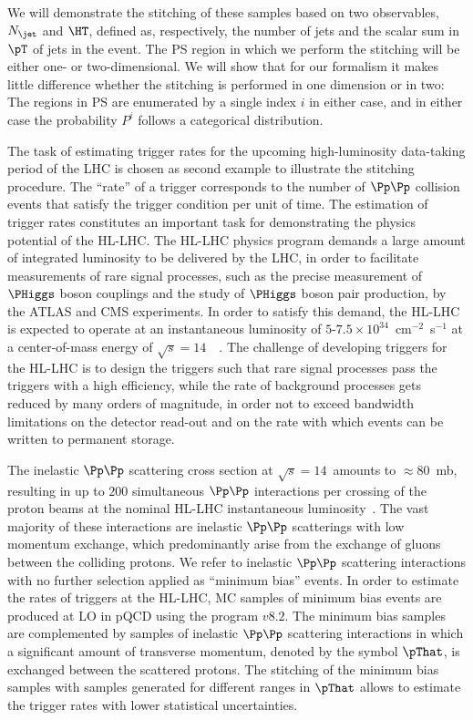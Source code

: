 We will demonstrate the stitching of these samples based on two observables,
$N_{\jet}$ and $\HT$, defined as, respectively, the number of jets and the scalar sum in $\pT$ of jets in the event.
The PS region in which we perform the stitching will be either one- or two-dimensional.
We will show that for our formalism
it makes little difference whether the stitching is performed in one dimension or in two:
The regions in PS are enumerated by a single index $i$ in either case,
and in either case the probability $P^{i}$ follows a categorical distribution.

The task of estimating trigger rates for the upcoming high-luminosity data-taking period of the LHC is chosen as second example to illustrate the stitching procedure.
The ``rate'' of a trigger corresponds to the number of $\Pp\Pp$ collision events that satisfy the trigger condition per unit of time.
The estimation of trigger rates constitutes an important task for demonstrating the physics potential of the HL-LHC.
The HL-LHC physics program demands a large amount of integrated luminosity to be delivered by the LHC, 
in order to facilitate measurements of rare signal processes,
such as the precise measurement of $\PHiggs$ boson couplings and the study of $\PHiggs$ boson pair production, by the ATLAS and CMS experiments.
In order to satisfy this demand, the HL-LHC is expected to operate at an instantaneous luminosity of $5$-$7.5 \times 10^{34}$~cm$^{-2}$~s$^{-1}$
at a center-of-mass energy of $\sqrt{s} = 14$~\TeV~\cite{TDR_Phase2_LHC}.
The challenge of developing triggers for the HL-LHC is to design the triggers such that rare signal processes pass the triggers with a high efficiency,
while the rate of background processes gets reduced by many orders of magnitude, in order not to exceed bandwidth limitations on the detector read-out 
and on the rate with which events can be written to permanent storage.

The inelastic $\Pp\Pp$ scattering cross section at $\sqrt{s} = 14$~\TeV amounts to $\approx 80$~mb,
resulting in up to $200$ simultaneous $\Pp\Pp$ interactions per crossing of the proton beams at the nominal HL-LHC instantaneous luminosity~\cite{TDR_Phase2_LHC}.
The vast majority of these interactions are inelastic $\Pp\Pp$ scatterings with low momentum exchange,
which predominantly arise from the exchange of gluons between the colliding protons.
We refer to inelastic $\Pp\Pp$ scattering interactions with no further selection applied as ``minimum bias'' events.
In order to estimate the rates of triggers at the HL-LHC,
MC samples of minimum bias events are produced at LO in pQCD using the program \PYTHIA $v8.2$.
The minimum bias samples are complemented by samples of inelastic $\Pp\Pp$ scattering interactions
in which a significant amount of transverse momentum, denoted by the symbol $\pThat$, is exchanged between the scattered protons.
The stitching of the minimum bias samples with samples generated for different ranges in $\pThat$ allows to estimate the trigger rates with lower statistical uncertainties.

